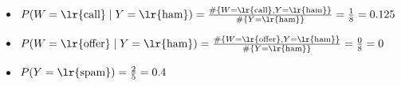 \begin{ابجد}
\begin{LTR}
\begin{itemize}
        \item $P(W = \text{\lr{call}} \mid Y = \text{\lr{ham}}) = \frac{\#\{W = \text{\lr{call}}, Y = \text{\lr{ham}}\}}{\#\{Y = \text{\lr{ham}}\}} = \frac{1}{8} = 0.125$

        \item $P(W = \text{\lr{offer}} \mid Y = \text{\lr{ham}}) = \frac{\#\{W = \text{\lr{offer}}, Y = \text{\lr{ham}}\}}{\#\{Y = \text{\lr{ham}}\}} = \frac{0}{8} = 0$

        \item $P(Y = \text{\lr{spam}}) = \frac{2}{5} = 0.4$
    \end{itemize}
\end{LTR}

\end{ابجد}